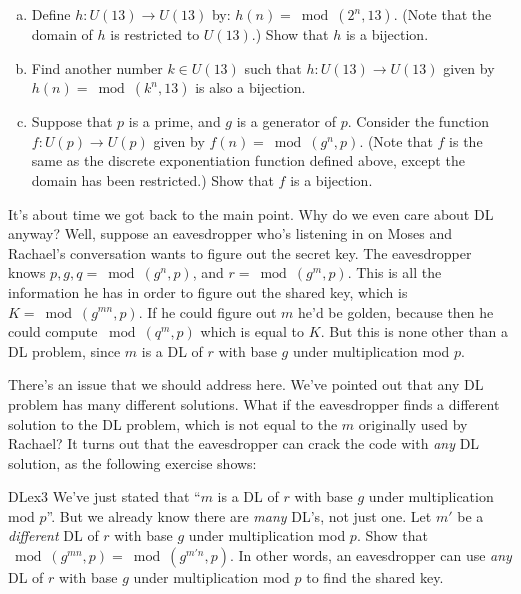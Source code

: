 \begin{exercise}{} 
\begin{enumerate}[(a)]
\item
Define $h: U(13) \rightarrow U(13)$ by: $h(n) = \bmod(2^n,13)$.  (Note that the domain of $h$ is restricted to $U(13)$.)  Show that $h$ is a bijection.
\item
Find another number $k \in U(13)$ such that $h: U(13) \rightarrow U(13)$ given by $h(n) = \bmod(k^n,13)$ is also a bijection.
\item
Suppose that $p$ is a prime, and $g$ is a generator of $p$.  Consider the function $f: U(p) \rightarrow U(p)$ given by $f(n) = \bmod(g^n,p)$.  (Note that $f$ is the same as the discrete exponentiation function defined above, except the domain has been restricted.)  Show that $f$ is a bijection.
\end{enumerate}
\end{exercise}

It's about time we got back to the main point. Why do we even care about DL anyway? Well, suppose an eavesdropper who's listening in on Moses and Rachael's conversation wants to figure out the secret key. 
The eavesdropper knows $p, g, q=\bmod(g^n,p)$, and $r=\bmod(g^m,p)$.  This is all the information he has in order to figure out the shared key, which is  $K=\bmod(g^{mn},p)$. If he could figure out $m$ he'd be golden, because then he could compute $\bmod(q^m,p)$ which is equal to $K$. But this is none other than a DL problem, since $m$ is a DL of $r$ with base $g$ under multiplication mod $p$.  

There's an issue that we should address here. We've pointed out that any DL problem has many different solutions. What if the eavesdropper finds a different solution to the DL problem, which is not equal to the $m$ originally used by Rachael? It turns out that the eavesdropper can crack the code with \emph{any} DL solution, as the following exercise shows:

\begin{exercise}{DLex3}
We've just stated that ``$m$ is a DL of $r$ with base $g$ under multiplication mod $p$''.  But we already know there are \emph{many} DL's, not just one. Let $m'$ be a \emph{different} DL of $r$ with base $g$ under multiplication mod $p$. Show that $\bmod(g^{mn},p)=\bmod(g^{m'n},p)$. In other words, an eavesdropper can use \emph{any} DL of $r$ with base $g$ under multiplication mod $p$ to find the shared key.
\end{exercise}

